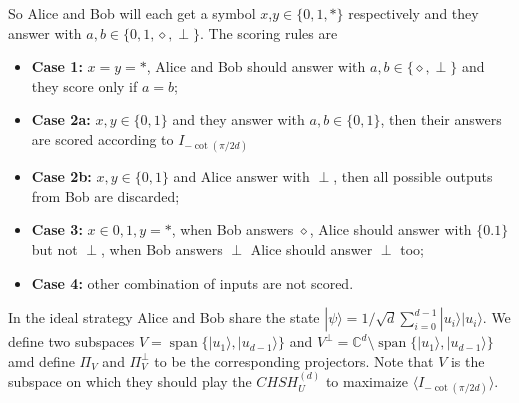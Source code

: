 \documentclass[11pt,letterpaper]{article}
\newcommand{\ket}[1]{|#1\rangle}
\DeclareMathOperator{\spn}{span}
\newcommand{\C}{\mathbb{C}}
\newcommand{\1}{\mathbb{1}}
\newcommand{\CHSH}{CHSH^{(d)}}
\theoremstyle{definition}
\begin{document}
So Alice and Bob will each get a symbol $x$,$y \in \{ 0, 1, \ast\}$ respectively and they answer with $a,b \in \{0,1,\diamond,\perp\}$. 
The scoring rules are
\begin{itemize}
	\item \textbf{Case 1:} $x = y = \ast$, Alice and Bob should answer with $a, b \in \{\diamond, \perp\}$ and 
	they score only if $a = b$;
	\item \textbf{Case 2a:} $x,y \in \{0,1\}$ and they answer with $a,b \in \{0,1\}$, then
	their answers are scored according to $I_{-\cot(\pi/2d)}$
	\item \textbf{Case 2b:} $x,y \in \{0,1\}$ and Alice answer with $\perp$, then all possible outputs from Bob
	are discarded;
	\item \textbf{Case 3:} $x \in {0,1}, y = \ast$, when Bob answers $\diamond$, Alice should answer with $\{0.1\}$ but not $\perp$,
	when Bob answers $\perp$ Alice should answer $\perp$ too;
	\item \textbf{Case 4:} other combination of inputs are not scored.
\end{itemize}
In the ideal strategy Alice and Bob share the state $\ket{\psi} =1/\sqrt{d} \sum_{i=0}^{d-1} \ket{u_i}\ket{u_i}$.
We define two subspaces $V = \spn\{\ket{u_1}, \ket{u_{d-1}}\}$ and $V^\perp = \C^d \setminus\spn\{\ket{u_1}, \ket{u_{d-1}}\}$ amd
define $\Pi_V$ and $\Pi_{V}^\perp$ to be the corresponding projectors. Note that $V$ is the subspace on which they should play the 
$\CHSH_U$ to maximaize $\langle I_{-\cot(\pi/2d)} \rangle$.
\end{document}
